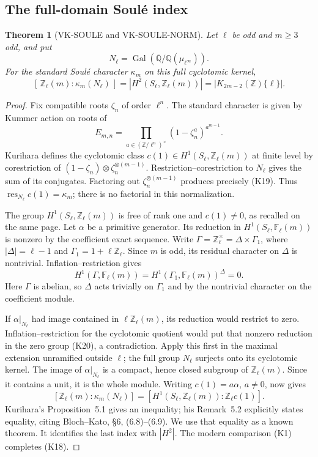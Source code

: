 \documentclass[11pt,a4paper]{article}
\newtheorem{theorem}{Theorem}[section]
\theoremstyle{definition}
\begin{document}
\subsection{The full-domain Soul\'e index}

\begin{theorem}[VK-SOULE and VK-SOULE-NORM]
Let \(\ell\) be odd and \(m\ge3\) odd, and put
\[
 N_\ell=\operatorname{Gal}
   (\overline{\mathbb Q}/\mathbb Q(\mu_{\ell^\infty})).
\]
For the standard Soul\'e character \(\kappa_m\) on this
full cyclotomic kernel,
\[
 [\,\mathbb Z_\ell(m):\kappa_m(N_\ell)\,]
   =|H^2(S_\ell,\mathbb Z_\ell(m))|
   =|K_{2m-2}(\mathbb Z)\{\ell\}|.                   \tag{K18}
\]
\end{theorem}

\begin{proof}
Fix compatible roots \(\zeta_n\) of order \(\ell^n\).
The standard character is given by Kummer action on roots of
\[
 E_{m,n}=
 \prod_{a\in(\mathbb Z/\ell^n)^\times}
       (1-\zeta_n^a)^{a^{m-1}}.                    \tag{K19}
\]
Kurihara \cite[p.~233, (4)]{Kurihara1992} defines the
cyclotomic class \(c(1)\in H^1(S_\ell,\mathbb Z_\ell(m))\)
at finite level by corestriction of
\((1-\zeta_n)\otimes\zeta_n^{\otimes(m-1)}\).
Restriction--corestriction to \(N_\ell\) gives the sum
of its conjugates. Factoring out
\(\zeta_n^{\otimes(m-1)}\) produces precisely (K19).
Thus \(\operatorname{res}_{N_\ell}c(1)=\kappa_m\);
there is no factorial in this normalization.

The group \(H^1(S_\ell,\mathbb Z_\ell(m))\) is free of
rank one and \(c(1)\ne0\), as recalled on the same page.
Let \(\alpha\) be a primitive generator. Its reduction in
\(H^1(S_\ell,\mathbb F_\ell(m))\) is nonzero by the
coefficient exact sequence. Write
\(\Gamma=\mathbb Z_\ell^\times=\Delta\times\Gamma_1\),
where \(|\Delta|=\ell-1\) and \(\Gamma_1=1+\ell\mathbb Z_\ell\).
Since \(m\) is odd, its residual character on \(\Delta\)
is nontrivial. Inflation--restriction gives
\[
 H^1(\Gamma,\mathbb F_\ell(m))
 =H^1(\Gamma_1,\mathbb F_\ell(m))^\Delta=0.           \tag{K20}
\]
Here \(\Gamma\) is abelian, so \(\Delta\) acts trivially
on \(\Gamma_1\) and by the nontrivial character on the
coefficient module.

If \(\alpha|_{N_\ell}\) had image contained in
\(\ell\mathbb Z_\ell(m)\), its reduction would restrict
to zero. Inflation--restriction for the cyclotomic quotient
would put that nonzero reduction in the zero group (K20),
a contradiction. Apply this first in the maximal extension
unramified outside \(\ell\); the full group \(N_\ell\)
surjects onto its cyclotomic kernel. The image of
\(\alpha|_{N_\ell}\) is a compact, hence closed subgroup
of \(\mathbb Z_\ell(m)\). Since it contains a unit,
it is the whole module.
Writing \(c(1)=a\alpha\), \(a\ne0\), now gives
\[
 [\mathbb Z_\ell(m):\kappa_m(N_\ell)]
 =[H^1(S_\ell,\mathbb Z_\ell(m)):\mathbb Z_\ell c(1)].
\]
Kurihara's Proposition~5.1 gives an inequality; his
Remark~5.2 explicitly states equality, citing Bloch--Kato,
\S6, (6.8)--(6.9). We use that equality as a known
theorem. It identifies the last index with \(|H^2|\).
The modern comparison (K1) completes (K18).
\end{proof}
\end{document}
